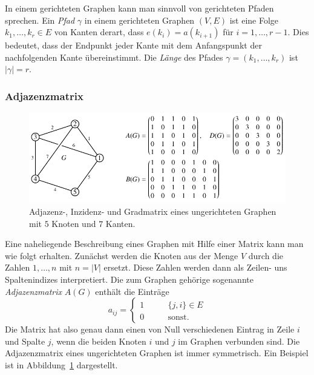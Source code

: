 In einem gerichteten Graphen kann man sinnvoll von gerichteten Pfaden
sprechen.
%
Ein {\em Pfad} $\gamma$ in einem gerichteten Graphen $(V,E)$ ist eine Folge
$k_1,\dots,k_r\in E$ von Kanten derart, dass $e(k_i) = a(k_{i+1})$
für $i=1,\dots,r-1$.
Dies bedeutet, dass der Endpunkt jeder Kante mit dem Anfangspunkt der
nachfolgenden Kante übereinstimmt.
Die {\em Länge} des Pfades $\gamma=(k_1,\dots,k_r)$ ist $|\gamma|=r$.

\subsubsection{Adjazenzmatrix}
\begin{figure}
\centering
\includegraphics{chapters/70-graphen/images/adjazenzu.pdf}
\caption{Adjazenz-, Inzidenz- und Gradmatrix eines ungerichteten
Graphen mit $5$ Knoten und $7$ Kanten.
\label{buch:graphen:fig:adjazenzu}}
\end{figure}
Eine naheliegende Beschreibung eines Graphen mit Hilfe einer
Matrix kann man wie folgt erhalten.
Zunächst werden die Knoten aus der Menge $V$ durch die Zahlen
$1,\dots,n$ mit $n=|V|$ ersetzt.
Diese Zahlen werden dann als Zeilen- uns Spaltenindizes interpretiert.
Die zum Graphen gehörige sogenannte {\em Adjazenzmatrix} $A(G)$
enthält die Einträge
\begin{equation}
a_{ij}
=
\begin{cases}
1&\qquad  \{j,i\} \in E\\
0&\qquad  \text{sonst.}
\end{cases}
\label{buch:graphen:eqn:linkmatrix}
\end{equation}
Die Matrix hat also genau dann einen von Null verschiedenen Eintrag
in Zeile $i$ und Spalte $j$, wenn die beiden Knoten $i$ und $j$
im Graphen verbunden sind.
Die Adjazenzmatrix eines ungerichteten Graphen ist immer symmetrisch.
Ein Beispiel ist in Abbildung~\ref{buch:graphen:fig:adjazenzu}
dargestellt.


